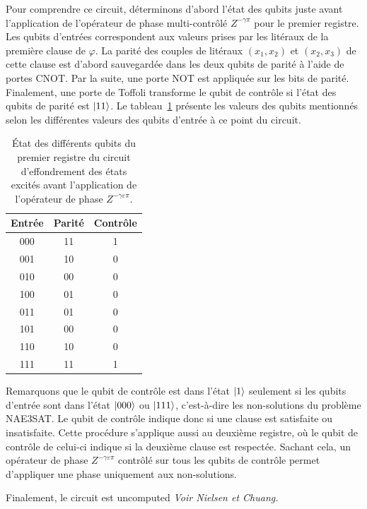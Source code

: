 Pour comprendre ce circuit, déterminons d'abord l'état des qubits juste avant l'application de l'opérateur de phase multi-contrôlé $Z^{-\gamma \pi}$ pour le premier registre. Les qubits d'entrées correspondent aux valeurs prises par les litéraux de la première clause de $\varphi$. La parité des couples de litéraux $(x_{1}, x_{2})$ et $(x_{2}, x_{3})$ de cette clause est d'abord sauvegardée dans les deux qubits de parité à l'aide de portes CNOT. Par la suite, une porte NOT est appliquée sur les bits de parité. Finalement, une porte de Toffoli transforme le qubit de contrôle si l'état des qubits de parité est $\ket{11}$. Le tableau~\ref{tab:tower-excited-states-parity} présente les valeurs des qubits mentionnés selon les différentes valeurs des qubits d'entrée à ce point du circuit.

\begin{table}[h]
    \centering
    \begin{tabular}{c c c}
        \hline
        Entrée & Parité & Contrôle \\
        \hline
        000 & 11 & 1 \\
        001 & 10 & 0 \\
        010 & 00 & 0 \\
        100 & 01 & 0 \\
        011 & 01 & 0 \\
        101 & 00 & 0 \\
        110 & 10 & 0 \\
        111 & 11 & 1 \\
        \hline
    \end{tabular}
    \caption{État des différents qubits du premier registre du circuit d'effondrement des états excités avant l'application de l'opérateur de phase $Z^{-\gamma \varepsilon \pi}$.}
    \label{tab:tower-excited-states-parity}
\end{table}

Remarquons que le qubit de contrôle est dans l'état $\ket{1}$ seulement si les qubits d'entrée sont dans l'état $\ket{000}$ ou $\ket{111}$, c'est-à-dire les non-solutions du problème NAE3SAT. Le qubit de contrôle indique donc si une clause est satisfaite ou insatisfaite. Cette procédure s'applique aussi au deuxième registre, où le qubit de contrôle de celui-ci indique si la deuxième clause est respectée. Sachant cela, un opérateur de phase $Z^{-\gamma \varepsilon \pi}$ contrôlé sur tous les qubits de contrôle permet d'appliquer une phase uniquement aux non-solutions.

Finalement, le circuit est uncomputed  \textcolor{mydarkred}{\textit{Voir Nielsen et Chuang.}}


